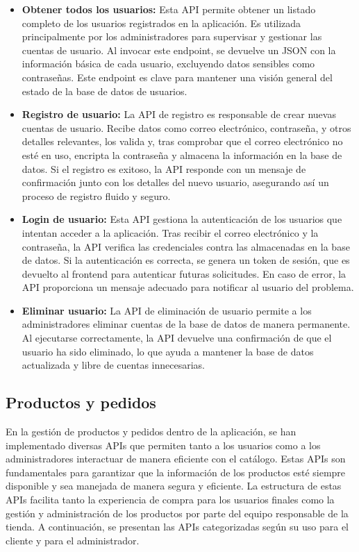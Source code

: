 \begin{itemize}
    \item \textbf{Obtener todos los usuarios:} Esta API permite obtener un listado completo de los usuarios registrados en la aplicación. Es utilizada principalmente por los administradores para supervisar y gestionar las cuentas de usuario. Al invocar este endpoint, se devuelve un JSON con la información básica de cada usuario, excluyendo datos sensibles como contraseñas. Este endpoint es clave para mantener una visión general del estado de la base de datos de usuarios.
    
    \item \textbf{Registro de usuario:} La API de registro es responsable de crear nuevas cuentas de usuario. Recibe datos como correo electrónico, contraseña, y otros detalles relevantes, los valida y, tras comprobar que el correo electrónico no esté en uso, encripta la contraseña y almacena la información en la base de datos. Si el registro es exitoso, la API responde con un mensaje de confirmación junto con los detalles del nuevo usuario, asegurando así un proceso de registro fluido y seguro.
    
    \item \textbf{Login de usuario:} Esta API gestiona la autenticación de los usuarios que intentan acceder a la aplicación. Tras recibir el correo electrónico y la contraseña, la API verifica las credenciales contra las almacenadas en la base de datos. Si la autenticación es correcta, se genera un token de sesión, que es devuelto al frontend para autenticar futuras solicitudes. En caso de error, la API proporciona un mensaje adecuado para notificar al usuario del problema.

    \item \textbf{Eliminar usuario:} La API de eliminación de usuario permite a los administradores eliminar cuentas de la base de datos de manera permanente. Al ejecutarse correctamente, la API devuelve una confirmación de que el usuario ha sido eliminado, lo que ayuda a mantener la base de datos actualizada y libre de cuentas innecesarias.
    
\end{itemize}

\subsection{Productos y pedidos}\label{subsec5.3.2}

En la gestión de productos y pedidos dentro de la aplicación, se han implementado diversas APIs que permiten tanto a los usuarios como a los administradores interactuar de manera eficiente con el catálogo. Estas APIs son fundamentales para garantizar que la información de los productos esté siempre disponible y sea manejada de manera segura y eficiente. La estructura de estas APIs facilita tanto la experiencia de compra para los usuarios finales como la gestión y administración de los productos por parte del equipo responsable de la tienda. A continuación, se presentan las APIs categorizadas según su uso para el cliente y para el administrador.

